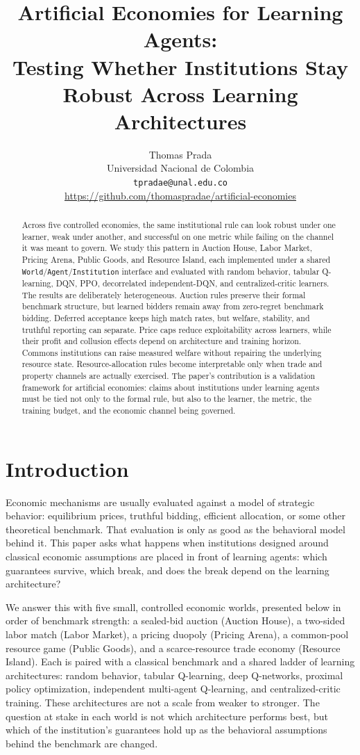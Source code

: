 \documentclass[11pt]{article}
\title{Artificial Economies for Learning Agents:\\
Testing Whether Institutions Stay Robust Across Learning Architectures}
\author{
  Thomas Prada\\
  Universidad Nacional de Colombia\\
  \texttt{tpradae@unal.edu.co}\\
  \url{https://github.com/thomaspradae/artificial-economies}
}
\date{}
\newcommand{\code}[1]{\texttt{#1}}
\begin{document}
\maketitle

\begin{abstract}
\setlength{\parindent}{0pt}
Across five controlled economies, the same institutional rule can look robust
under one learner, weak under another, and successful on one metric while
failing on the channel it was meant to govern. We study this pattern in Auction
House, Labor Market, Pricing Arena, Public Goods, and Resource Island, each
implemented under a shared \code{World}/\code{Agent}/\code{Institution}
interface and evaluated with random behavior, tabular Q-learning, DQN, PPO,
decorrelated independent-DQN, and centralized-critic learners. The results are
deliberately heterogeneous. Auction rules preserve their formal benchmark
structure, but learned bidders remain away from zero-regret benchmark bidding.
Deferred acceptance keeps high match rates, but welfare, stability, and
truthful reporting can separate. Price caps reduce exploitability across
learners, while their profit and collusion effects depend on architecture and
training horizon. Commons institutions can raise measured welfare without
repairing the underlying resource state. Resource-allocation rules become
interpretable only when trade and property channels are actually exercised. The
paper's contribution is a validation framework for artificial economies:
claims about institutions under learning agents must be tied not only to the
formal rule, but also to the learner, the metric, the training budget, and the
economic channel being governed.
\end{abstract}

\section{Introduction}

Economic mechanisms are usually evaluated against a model of strategic behavior:
equilibrium prices, truthful bidding, efficient allocation, or some other
theoretical benchmark. That evaluation is only as good as the behavioral model
behind it. This paper asks what happens when institutions designed around
classical economic assumptions are placed in front of learning agents: which
guarantees survive, which break, and does the break depend on the
learning architecture?

We answer this with five small, controlled economic worlds, presented below in
order of benchmark strength: a sealed-bid auction (Auction House), a two-sided
labor match (Labor Market), a pricing duopoly (Pricing Arena), a common-pool
resource game (Public Goods), and a scarce-resource trade economy (Resource
Island). Each is paired with a classical benchmark and a
shared ladder of learning architectures: random behavior, tabular Q-learning,
deep Q-networks, proximal policy optimization, independent multi-agent
Q-learning, and centralized-critic training. These architectures are not a scale
from weaker to stronger. The question at stake in each world is not which
architecture performs best, but which of the institution's guarantees hold up as
the behavioral assumptions behind the benchmark are changed.
\end{document}
